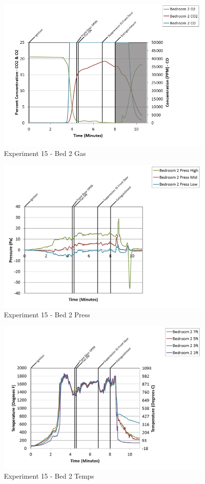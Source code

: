 \documentclass{article}
\begin{document}
\begin{appendices}
\begin{figure}[h!]
	\centering
	\includegraphics[height=3.05in]{0_Images/Results_Charts/Exp_15_Charts/Bed2Gas.png}
	\caption{Experiment 15 - Bed 2 Gas}
\end{figure}

\clearpage

\begin{figure}[h!]
	\centering
	\includegraphics[height=3.05in]{0_Images/Results_Charts/Exp_15_Charts/Bed2Press.png}
	\caption{Experiment 15 - Bed 2 Press}
\end{figure}


\begin{figure}[h!]
	\centering
	\includegraphics[height=3.05in]{0_Images/Results_Charts/Exp_15_Charts/Bed2Temps.png}
	\caption{Experiment 15 - Bed 2 Temps}
\end{figure}


\end{appendices}
\end{document}
